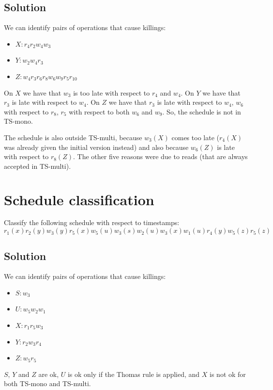 \documentclass[12pt, a4paper]{report}
\newtheorem[style=M,bodystyle=\normalfont]{theorem}{Theorem}
\newtheorem[style=M,bodystyle=\normalfont]{corollary}{Corollary}
\newtheorem[style=M,bodystyle=\normalfont]{lemma}{Lemma}
\newtheorem[style=M,bodystyle=\normalfont]{definition}{Definition}
\begin{document}
    \subsection*{Solution}
        We can identify pairs of operations that cause killings:
        \begin{itemize}
            \item $X: r_4 r_2 w_4 w_3$
            \item $Y: w_2 w_4 r_3$
            \item $Z: w_4 r_3 r_6 r_8 w_6 w_9 r_5 r_{10}$
        \end{itemize}
        On $X$ we have that $w_3$ is too late with respect to $r_4$ and $w_4$. On $Y$ we have that $r_3$ is late with respect to $w_4$. On 
        $Z$ we have that $r_3$ is late with respect to $w_4$, $w_6$ with respect to $r_8$, $r_5$ with respect to both $w_6$ and $w_9$. 
        So, the schedule is not in TS-mono. 

        The schedule is also outside TS-multi, because $w_3(X)$ comes too late ($r_4(X)$ was already given the initial version instead) and 
        also because $w_6(Z)$ is late with respect to $r_8(Z)$. The other five reasons were due to reads (that are always accepted in TS-multi).

    \newpage

    \section{Schedule classification}
        Classify the following schedule with respect to timestamps: 
        \[r_1(x) r_2(y) w_3(y) r_5(x) w_5(u) w_3(s) w_2(u) w_3(x) w_1(u) r_4(y) w_5(z) r_5(z)\]
    \subsection*{Solution}
        We can identify pairs of operations that cause killings:
        \begin{itemize}
            \item $S:w_3$
            \item $U:w_5w_2w_1$
            \item $X:r_1r_5w_3$
            \item $Y:r_2w_3r_4$
            \item $Z:w_5r_5$
        \end{itemize}
        $S$, $Y$ and $Z$ are ok, $U$ is ok only if the Thomas rule is applied, and $X$ is not ok for both TS-mono and TS-multi. 
\end{document}
